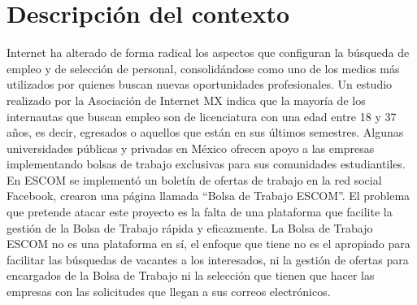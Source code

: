 \section{Descripción del contexto}
	Internet ha alterado de forma radical los aspectos que configuran la búsqueda de empleo y de selección de personal, 
	consolidándose como uno de los medios más utilizados por quienes buscan nuevas oportunidades profesionales. Un estudio 
	realizado por la Asociación de Internet MX indica que la mayoría de los internautas que buscan empleo son de licenciatura con 
	una edad entre 18 y 37 años, es decir, egresados o aquellos que están en sus últimos semestres. Algunas universidades 
	públicas y privadas en México ofrecen apoyo a las empresas implementando bolsas de trabajo exclusivas para sus comunidades 
	estudiantiles. En ESCOM se implementó un boletín de ofertas de trabajo en la red social Facebook, crearon una página llamada 
	``Bolsa de Trabajo ESCOM''. \newline
	El problema que pretende atacar este proyecto es la falta de una plataforma que facilite la gestión de la Bolsa de Trabajo 
	rápida y eficazmente. La Bolsa de Trabajo ESCOM no es una plataforma en sí, el enfoque que tiene no es el apropiado para 
	facilitar las búsquedas de vacantes a los interesados, ni la gestión de ofertas para encargados de la Bolsa de Trabajo ni 
	la selección que tienen que hacer las empresas con las solicitudes que llegan a sus correos electrónicos.


